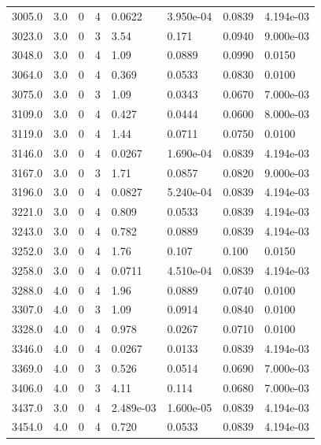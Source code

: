 \documentclass[preview]{standalone}
\begin{document}
{{{{{\begin{tabular}{L{1.2cm}C{1.2cm} C{0.3cm}C{0.5cm} C{1.4cm}C{1.4cm} C{1.4cm}C{1.4cm}}
  3005.0  &   3.0  & 0     &  4 &  0.0622  & 3.950e-04  & 0.0839 &  4.194e-03   \\ 
  3023.0  &   3.0  & 0     &  3 &  3.54  & 0.171  & 0.0940 &  9.000e-03   \\ 
  3048.0  &   3.0  & 0     &  4 &  1.09  & 0.0889  & 0.0990 &  0.0150   \\ 
  3064.0  &   3.0  & 0     &  4 &  0.369  & 0.0533  & 0.0830 &  0.0100   \\ 
  3075.0  &   3.0  & 0     &  3 &  1.09  & 0.0343  & 0.0670 &  7.000e-03   \\ 
  3109.0  &   3.0  & 0     &  4 &  0.427  & 0.0444  & 0.0600 &  8.000e-03   \\ 
  3119.0  &   3.0  & 0     &  4 &  1.44  & 0.0711  & 0.0750 &  0.0100   \\ 
  3146.0  &   3.0  & 0     &  4 &  0.0267  & 1.690e-04  & 0.0839 &  4.194e-03   \\ 
  3167.0  &   3.0  & 0     &  3 &  1.71  & 0.0857  & 0.0820 &  9.000e-03   \\ 
  3196.0  &   3.0  & 0     &  4 &  0.0827  & 5.240e-04  & 0.0839 &  4.194e-03   \\ 
  3221.0  &   3.0  & 0     &  4 &  0.809  & 0.0533  & 0.0839 &  4.194e-03   \\ 
  3243.0  &   3.0  & 0     &  4 &  0.782  & 0.0889  & 0.0839 &  4.194e-03   \\ 
  3252.0  &   3.0  & 0     &  4 &  1.76  & 0.107  & 0.100 &  0.0150   \\ 
  3258.0  &   3.0  & 0     &  4 &  0.0711  & 4.510e-04  & 0.0839 &  4.194e-03   \\ 
  3288.0  &   4.0  & 0     &  4 &  1.96  & 0.0889  & 0.0740 &  0.0100   \\ 
  3307.0  &   4.0  & 0     &  3 &  1.09  & 0.0914  & 0.0840 &  0.0100   \\ 
  3328.0  &   4.0  & 0     &  4 &  0.978  & 0.0267  & 0.0710 &  0.0100   \\ 
  3346.0  &   4.0  & 0     &  4 &  0.0267  & 0.0133  & 0.0839 &  4.194e-03   \\ 
  3369.0  &   4.0  & 0     &  3 &  0.526  & 0.0514  & 0.0690 &  7.000e-03   \\ 
  3406.0  &   4.0  & 0     &  3 &  4.11  & 0.114  & 0.0680 &  7.000e-03   \\ 
  3437.0  &   3.0  & 0     &  4 &  2.489e-03  & 1.600e-05  & 0.0839 &  4.194e-03   \\ 
  3454.0  &   4.0  & 0     &  4 &  0.720  & 0.0533  & 0.0839 &  4.194e-03   \\ 

\end{tabular}}}}}}
\end{document}
